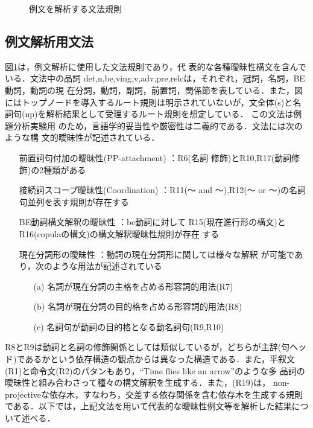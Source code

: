 \begin{figure}[b]
 \begin{center}
 \end{center}
\myfiglabelskip
\caption{例文を解析する文法規則}
\label{fig:GrammarForExamples}
\end{figure}

\subsection{例文解析用文法}

図\ref{fig:GrammarForExamples}は，例文解析に使用した文法規則であり，代
表的な各種曖昧性構文を含んでいる．文法中の品詞
det,n,be,ving,v,adv,pre,relcは，それぞれ，冠詞，名詞，BE動詞，動詞の現
在分詞，動詞，副詞，前置詞，関係節を表している．また，図にはトップノードを導入するルート規則は明示されていないが，文全体(s)と名詞句(np)を解析結果として受理するルート規則を想定している．
この文法は例題分析実験用
のため，言語学的妥当性や厳密性は二義的である．文法には次のような構
文的曖昧性が記述されている．

\begin{itemize}
\item[{\myitemindent}前置詞句付加の曖昧性(PP-attachment)] ：R6(名詞
修飾)とR10,R17(動詞修飾)の2種類がある
\item[{\myitemindent}接続詞スコープ曖昧性(Coordination)] ：R11(〜 and
〜),R12(〜 or 〜)の名詞句並列を表す規則が存在する
\item[{\myitemindent}BE動詞構文解釈の曖昧性] ：be動詞に対して
R15(現在進行形の構文)とR16(copulaの構文)の構文解釈曖昧性規則が存在
する
\item[{\myitemindent}現在分詞形の曖昧性] ：動詞の現在分詞形に関しては様々な解釈
が可能であり，次のような用法が記述されている
\begin{itemize}
\item[(a)] 名詞が現在分詞の主格を占める形容詞的用法(R7)
\item[(b)] 名詞が現在分詞の目的格を占める形容詞的用法(R8)
\item[(c)] 名詞句が動詞の目的格となる動名詞句(R9,R10)
\end{itemize}
\end{itemize}

R8とR9は動詞と名詞の修飾関係としては類似しているが，どちらが主辞(句ヘッ
ド)であるかという依存構造の観点からは異なった構造である．また，平叙文
(R1)と命令文(R2)のパタンもあり，``Time flies like an arrow''のような多
品詞の曖昧性と組み合わさって種々の構文解釈を生成する．また，(R19)は，
non-projectiveな依存木，すなわち，交差する依存関係を含む依存木を生成する規則である．以下では，上記文法を用いて代表的な曖昧性例文等を解析した結果について述べる．

